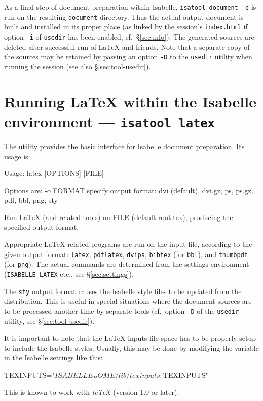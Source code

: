 \medskip As a final step of document preparation within Isabelle,
\texttt{isatool document -c} is run on the resulting \texttt{document}
directory.  Thus the actual output document is built and installed in its
proper place (as linked by the session's \texttt{index.html} if option
\texttt{-i} of \texttt{usedir} has been enabled, cf.\ \S\ref{sec:info}).  The
generated sources are deleted after successful run of {\LaTeX} and friends.
Note that a separate copy of the sources may be retained by passing an option
\texttt{-D} to the \texttt{usedir} utility when running the session (see also
\S\ref{sec:tool-usedir}).


\section{Running {\LaTeX} within the Isabelle environment --- \texttt{isatool latex}}
\label{sec:tool-latex}

The  utility provides the basic interface for Isabelle document
preparation.  Its usage is:
\begin{ttbox}
Usage: latex [OPTIONS] [FILE]

  Options are:
    -o FORMAT    specify output format: dvi (default), dvi.gz, ps,
                 ps.gz, pdf, bbl, png, sty

  Run LaTeX (and related tools) on FILE (default root.tex),
  producing the specified output format.
\end{ttbox}
Appropriate {\LaTeX}-related programs are run on the input file, according to
the given output format: \texttt{latex}, \texttt{pdflatex}, \texttt{dvips},
\texttt{bibtex} (for \texttt{bbl}), and \texttt{thumbpdf} (for \texttt{png}).
The actual commands are determined from the settings environment
(\texttt{ISABELLE_LATEX} etc., see \S\ref{sec:settings}).

The \texttt{sty} output format causes the Isabelle style files to be updated
from the distribution.  This is useful in special situations where the
document sources are to be processed another time by separate tools (cf.\ 
option \texttt{-D} of the \texttt{usedir} utility, see
\S\ref{sec:tool-usedir}).

It is important to note that the {\LaTeX} inputs file space has to be properly
setup to include the Isabelle styles.  Usually, this may be done by modifying
the \settdx{TEXINPUTS} variable in the Isabelle settings like this:
\begin{ttbox}
TEXINPUTS="$ISABELLE_HOME/lib/texinputs:$TEXINPUTS"
\end{ttbox}
This is known to work with \textsl{teTeX} (version 1.0 or later).



